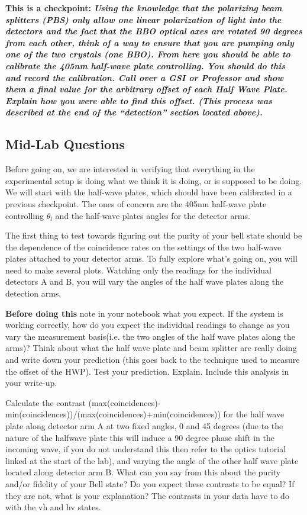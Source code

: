 \documentclass{../lab}
\begin{document}
\textbf{This is a checkpoint:} \emph{\textbf{Using the knowledge that the polarizing beam splitters (PBS) only allow one linear polarization of light into the detectors and the fact that the BBO optical axes are rotated 90 degrees from each other, think of a way to ensure that you are pumping only one of the two crystals (one BBO). From here you should be able to calibrate the 405nm half-wave plate controlling. You should do this and record the calibration. Call over a GSI or Professor and show them a final value for the arbitrary offset of each Half Wave Plate. Explain how you were able to find this offset. (This process was described at the end of the ``detection'' section located above). }}

\subsection{Mid-Lab Questions}

Before going on, we are interested in verifying that everything in the experimental setup is doing what we think it is doing, or is supposed to be doing. We will start with the half-wave plates, which should have been calibrated in a previous checkpoint. The ones of concern are the 405nm half-wave plate controlling $\theta_l$ and the half-wave plates angles for the detector arms.

The first thing to test towards figuring out the purity of your bell state should be the dependence of the coincidence rates on the settings of the two half-wave plates attached to your detector arms. To fully explore what's going on, you will need to make several plots. Watching only the readings for the individual detectors A and B, you will vary the angles of the half wave plates along the detection arms.

\textbf{Before doing this} note in your notebook what you expect. If the system is working correctly, how do you expect the individual readings to change as you vary the measurement basis(i.e. the two angles of the half wave plates along the arms)? Think about what the half wave plate and beam splitter are really doing and write down your prediction (this goes back to the technique used to measure the offset of the HWP). Test your prediction. Explain. Include this analysis in your write-up.

Calculate the contrast (max(coincidences)-min(coincidences))/(max(coincidences)+min(coincidences)) for the half wave plate along detector arm A at two fixed angles, 0 and 45 degrees (due to the nature of the halfwave plate this will induce a 90 degree phase shift in the incoming wave, if you do not understand this then refer to the optics tutorial linked at the start of the lab), and varying the angle of the other half wave plate located along detector arm B. What can you say from this about the purity and/or fidelity of your Bell state? Do you expect these contrasts to be equal? If they are not, what is your explanation? The contrasts in your data have to do with the vh and hv states.
\end{document}
